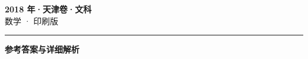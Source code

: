 \documentclass[zihao=5, a4paper]{ctexart}
\begin{document}
\begin{center}
  {\Large\bfseries 2018 年·天津卷·文科}\\[4pt]
  {\large 数学 · 印刷版}
\end{center}
\medskip
{}

\par\bigskip\hrule\bigskip
{}
\begin{center}{\large\bfseries 参考答案与详细解析}\end{center}
\smallskip

\end{document}
